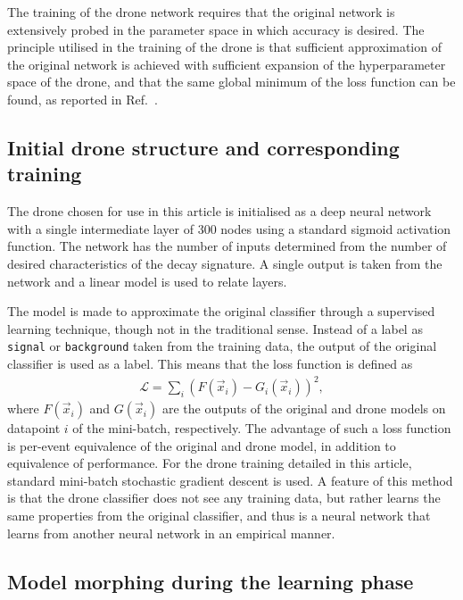 \documentclass[final,5p,times,twocolumn]{elsarticle}
\begin{document}
The training of the drone network requires that the original network is
extensively probed in the parameter space in which accuracy is desired.
The principle utilised in the training of the drone is that sufficient
approximation of the original network is achieved with sufficient expansion
of the hyperparameter space of the drone, and that the same global minimum
of the loss function can be found, as reported in Ref.~\cite{losssurfaces}.

\subsection{Initial drone structure and corresponding training}

The drone chosen for use in this article is initialised as a
deep neural network with a single intermediate layer of 300
nodes using a standard sigmoid activation function. The network
has the number of inputs determined from the number of desired
characteristics of the decay signature. A single output is taken
from the network and a linear model is used to relate layers. 

The model is made to approximate the original classifier through
a supervised learning technique, though not in the traditional sense.
Instead of a label as {\tt signal} or {\tt background} taken from the training data, the 
output of the original classifier is used as a label. This means that the
loss function is defined as
\begin{align}
\mathcal{L} = \sum_i \left( F(\vec{x}_i) - G_i(\vec{x}_i) \right)^2,
\end{align}
where $F(\vec{x}_i)$ and $G(\vec{x}_i)$ are the outputs 
of the original and drone models on datapoint
$i$ of the mini-batch, respectively. The advantage of such a loss function is per-event
equivalence of the original and drone model, in addition to equivalence
of performance. For the drone training detailed in this article, standard
mini-batch stochastic gradient descent is used. A feature of this method
is that the drone classifier does not see any training data,
but rather learns the same properties from the original classifier,
and thus is a neural network that learns from another neural network in an
empirical manner.

\subsection{Model morphing during the learning phase}
\end{document}
